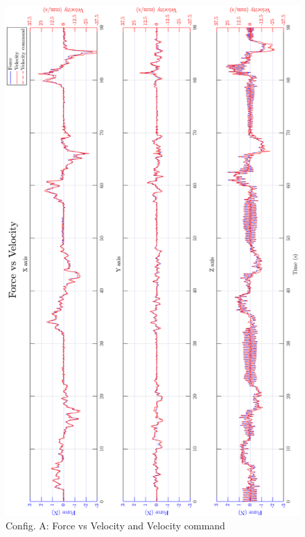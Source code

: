 \begin{figure}[htbp]
\begin{center}
\includegraphics[width=0.9\linewidth]{Images/exp/exp1_1_2.png}
\caption{Config. A: Force vs Velocity and Velocity command}
\label{fig: exp1_1_2}
\end{center}
\end{figure}

